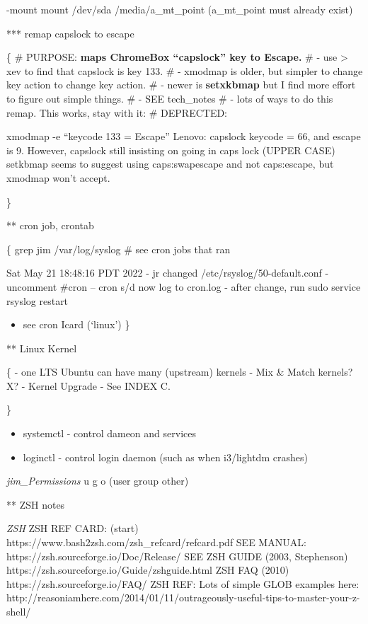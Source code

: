 \documentclass[
  letterpaper,
  DIV=11,
  numbers=noendperiod]{scrartcl}
\providecommand{\tightlist}{%
  \setlength{\itemsep}{0pt}\setlength{\parskip}{0pt}}\usepackage{longtable,booktabs,array}
\begin{document}
-mount mount /dev/sda /media/a\_mt\_point (a\_mt\_point must already
exist)

*** remap capslock to escape

\{ \# PURPOSE: \textbf{maps ChromeBox ``capslock'' key to Escape.} \# -
use \textgreater{} xev to find that capslock is key 133. \# - xmodmap is
older, but simpler to change key action to change key action. \# - newer
is \textbf{setxkbmap} but I find more effort to figure out simple
things. \# - SEE tech\_notes \# - lots of ways to do this remap. This
works, stay with it: \# DEPRECTED:

xmodmap -e ``keycode 133 = Escape'' Lenovo: capslock keycode = 66, and
escape is 9. However, capslock still insisting on going in caps lock
(UPPER CASE) setkbmap seems to suggest using caps:swapescape and not
caps:escape, but xmodmap won't accept.

\}

** cron job, crontab

\{ grep jim /var/log/syslog \# see cron jobs that ran

Sat May 21 18:48:16 PDT 2022 - jr changed /etc/rsyslog/50-default.conf -
uncomment \#cron -- cron s/d now log to cron.log - after change, run
sudo service rsyslog restart

\begin{itemize}
\tightlist
\item
  see cron Icard (`linux') \}
\end{itemize}

** Linux Kernel

\{ - one LTS Ubuntu can have many (upstream) kernels - Mix \& Match
kernels? X? - Kernel Upgrade - See INDEX C.

\}

\begin{itemize}
\tightlist
\item
  systemctl - control dameon and services
\item
  loginctl - control login daemon (such as when i3/lightdm crashes)
\end{itemize}

\emph{jim\_Permissions} u g o (user group other)

** ZSH notes

\emph{ZSH} ZSH REF CARD: (start)
https://www.bash2zsh.com/zsh\_refcard/refcard.pdf SEE MANUAL:
https://zsh.sourceforge.io/Doc/Release/ SEE ZSH GUIDE (2003, Stephenson)
https://zsh.sourceforge.io/Guide/zshguide.html ZSH FAQ (2010)
https://zsh.sourceforge.io/FAQ/ ZSH REF: Lots of simple GLOB examples
here:
http://reasoniamhere.com/2014/01/11/outrageously-useful-tips-to-master-your-z-shell/
\end{document}
